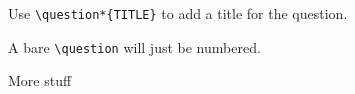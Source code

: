 \documentclass{homework}
\begin{document}
\maketitle

Use \verb|\question*{TITLE}| to add a title for the question.

\question
A bare \verb|\question| will just be numbered. 

\question
More stuff
\end{document}
